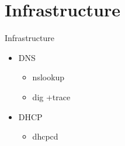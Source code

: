 \documentclass[aspectratio=169,10pt,t]{beamer}
\begin{document}
\section{Infrastructure}%
\label{sec:routing}


\begin{frame}[t]{Infrastructure}
	\begin{itemize}
		\item DNS
			\begin{itemize}
				\item nslookup
				\item dig +trace
			\end{itemize}
		\item DHCP
			\begin{itemize}
				\item dhcpcd
			\end{itemize}
	\end{itemize}
\end{frame}
\end{document}
